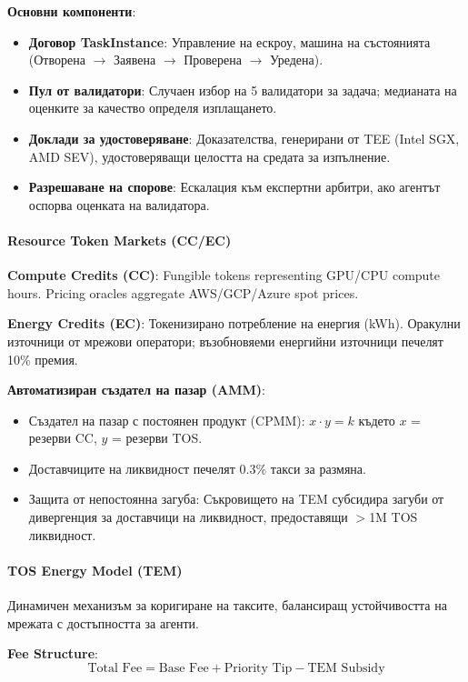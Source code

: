 \documentclass[11pt]{article}
\begin{document}
\textbf{Основни компоненти}:
\begin{itemize}[noitemsep]
  \item \textbf{Договор TaskInstance}: Управление на ескроу, машина на състоянията (Отворена $\to$ Заявена $\to$ Проверена $\to$ Уредена).
  \item \textbf{Пул от валидатори}: Случаен избор на 5 валидатори за задача; медианата на оценките за качество определя изплащането.
  \item \textbf{Доклади за удостоверяване}: Доказателства, генерирани от TEE (Intel SGX, AMD SEV), удостоверяващи целостта на средата за изпълнение.
  \item \textbf{Разрешаване на спорове}: Ескалация към експертни арбитри, ако агентът оспорва оценката на валидатора.
\end{itemize}

\paragraph{Resource Token Markets (CC/EC)}
\textbf{Compute Credits (CC)}: Fungible tokens representing GPU/CPU compute hours. Pricing oracles aggregate AWS/GCP/Azure spot prices.

\textbf{Energy Credits (EC)}: Токенизирано потребление на енергия (kWh). Оракулни източници от мрежови оператори; възобновяеми енергийни източници печелят 10\% премия.

\textbf{Автоматизиран създател на пазар (AMM)}:
\begin{itemize}[noitemsep]
  \item Създател на пазар с постоянен продукт (CPMM): $x \cdot y = k$ където $x$ = резерви CC, $y$ = резерви TOS.
  \item Доставчиците на ликвидност печелят 0.3\% такси за размяна.
  \item Защита от непостоянна загуба: Съкровището на TEM субсидира загуби от дивергенция за доставчици на ликвидност, предоставящи $>$1M TOS ликвидност.
\end{itemize}

\paragraph{TOS Energy Model (TEM)}
Динамичен механизъм за коригиране на таксите, балансиращ устойчивостта на мрежата с достъпността за агенти.

\textbf{Fee Structure}:
\begin{equation}
\text{Total Fee} = \text{Base Fee} + \text{Priority Tip} - \text{TEM Subsidy}
\end{equation}
\end{document}
